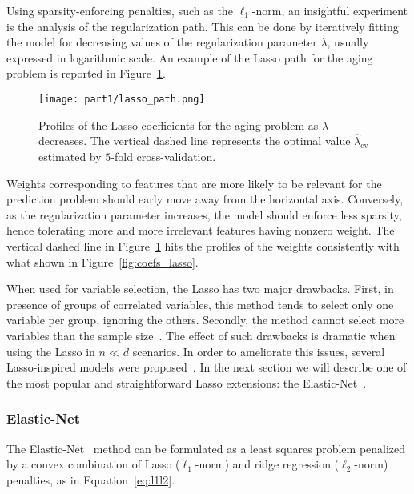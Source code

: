 			Using sparsity-enforcing penalties, such as the $\ell_1$-norm, an insightful experiment is the analysis of the regularization path. This can be done by iteratively fitting the model for decreasing values of the regularization parameter $\lambda$, usually expressed in logarithmic scale. An example of the Lasso path for the aging problem is reported in Figure~\ref{fig:lasso_path}.
			\begin{figure}[!h]
				\centering
				\texttt{[image: part1/lasso\_path.png]}
				\caption{Profiles of the Lasso coefficients for the aging problem as $\lambda$ decreases. The vertical dashed line represents the optimal value $\hat \lambda_{\text{cv}}$ estimated by $5$-fold cross-validation.} \label{fig:lasso_path}
			\end{figure}
			Weights corresponding to features that are more likely to be relevant for the prediction problem should early move away from the horizontal axis. Conversely, as the regularization parameter increases, the model should enforce less sparsity, hence tolerating more and more irrelevant features having nonzero weight. The vertical dashed line in Figure~\ref{fig:lasso_path} hits the profiles of the weights consistently with what shown in Figure~\ref{fig:coefs_lasso}.

			When used for variable selection, the Lasso has two major drawbacks. First, in presence of groups of correlated variables, this method tends to select only one variable per group, ignoring the others. Secondly, the method cannot select more variables than the sample size~\cite{waldmann2013evaluation, de2009regularized}.
			The effect of such drawbacks is dramatic when using the Lasso in $n \ll d$ scenarios.
			In order to ameliorate this issues, several Lasso-inspired models were proposed~\cite{meinshausen2010stability, hoggart2008simultaneous, zou2006adaptive}.
			In the next section we will describe one of the most popular and straightforward Lasso extensions: the Elastic-Net~\cite{zou2005regularization}.

			\subsubsection{Elastic-Net}
			The Elastic-Net~\cite{zou2005regularization, de2009elastic} method can be formulated as a least squares problem penalized by a convex combination of Lasso ($\ell_1$-norm) and ridge regression ($\ell_2$-norm) penalties, as in Equation~\eqref{eq:l1l2}.

